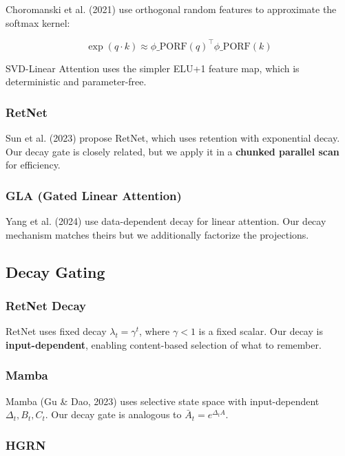 Choromanski et al. (2021) use orthogonal random features to approximate 
the softmax kernel:

\[
\exp(q \cdot k) \approx \phi\_{\text{PORF}}(q)^\top \phi\_{\text{PORF}}(k)
\tag{2.2}
\]

SVD-Linear Attention uses the simpler ELU+1 feature map, which is 
deterministic and parameter-free.

\subsubsection{RetNet}

Sun et al. (2023) propose RetNet, which uses retention with exponential 
decay. Our decay gate is closely related, but we apply it in a 
\textbf{chunked parallel scan} for efficiency.

\subsubsection{GLA (Gated Linear Attention)}

Yang et al. (2024) use data-dependent decay for linear attention. Our 
decay mechanism matches theirs but we additionally factorize the projections.

\subsection{Decay Gating}

\subsubsection{RetNet Decay}

RetNet uses fixed decay $\lambda_t = \gamma^{t}$, where $\gamma < 1$ is a 
fixed scalar. Our decay is \textbf{input-dependent}, enabling content-based 
selection of what to remember.

\subsubsection{Mamba}

Mamba (Gu \& Dao, 2023) uses selective state space with input-dependent 
$\Delta_t, B_t, C_t$. Our decay gate is analogous to $\bar{A}_t = e^{\Delta_t A}$.

\subsubsection{HGRN}

